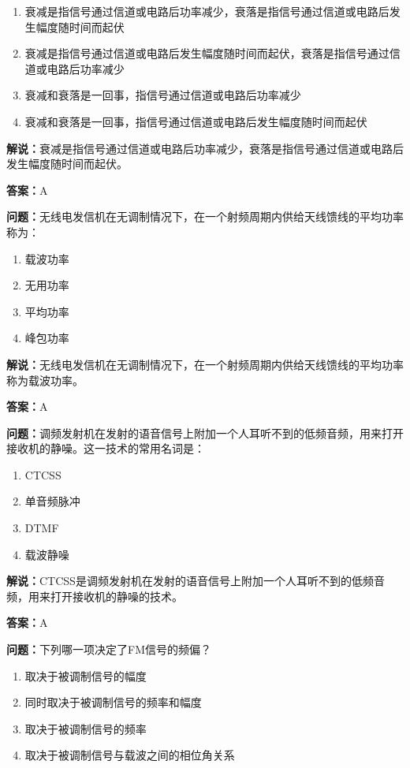 \begin{enumerate}[label=\Alph*), leftmargin=1cm]
	\item 衰减是指信号通过信道或电路后功率减少，衰落是指信号通过信道或电路后发生幅度随时间而起伏
	\item 衰减是指信号通过信道或电路后发生幅度随时间而起伏，衰落是指信号通过信道或电路后功率减少
	\item 衰减和衰落是一回事，指信号通过信道或电路后功率减少
	\item 衰减和衰落是一回事，指信号通过信道或电路后发生幅度随时间而起伏
\end{enumerate}

\textbf{解说：}衰减是指信号通过信道或电路后功率减少，衰落是指信号通过信道或电路后发生幅度随时间而起伏。%

\textbf{答案：}A

\textbf{问题：}无线电发信机在无调制情况下，在一个射频周期内供给天线馈线的平均功率称为：

\begin{enumerate}[label=\Alph*), leftmargin=1cm]
	\item 载波功率
	\item 无用功率
	\item 平均功率
	\item 峰包功率
\end{enumerate}

\textbf{解说：}无线电发信机在无调制情况下，在一个射频周期内供给天线馈线的平均功率称为载波功率。%

\textbf{答案：}A

\textbf{问题：}调频发射机在发射的语音信号上附加一个人耳听不到的低频音频，用来打开接收机的静噪。这一技术的常用名词是：

\begin{enumerate}[label=\Alph*), leftmargin=1cm]
	\item CTCSS
	\item 单音频脉冲
	\item DTMF
	\item 载波静噪
\end{enumerate}

\textbf{解说：}CTCSS是调频发射机在发射的语音信号上附加一个人耳听不到的低频音频，用来打开接收机的静噪的技术。%

\textbf{答案：}A

\textbf{问题：}下列哪一项决定了FM信号的频偏？

\begin{enumerate}[label=\Alph*), leftmargin=1cm]
	\item 取决于被调制信号的幅度
	\item 同时取决于被调制信号的频率和幅度
	\item 取决于被调制信号的频率
	\item 取决于被调制信号与载波之间的相位角关系
\end{enumerate}

